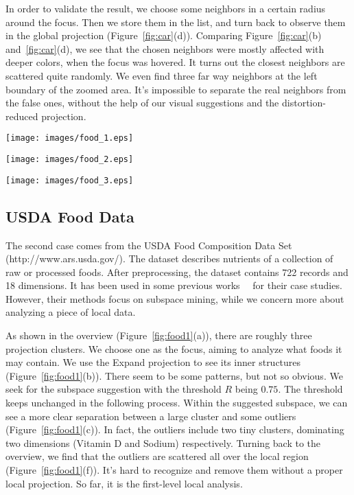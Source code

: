 In order to validate the result, we choose some neighbors in a certain radius around the focus. Then we store them in the list, and turn back to observe them in the global projection (Figure~\ref{fig:car}(d)). Comparing Figure~\ref{fig:car}(b) and~\ref{fig:car}(d), we see that the chosen neighbors were mostly affected with deeper colors, when the focus was hovered. It turns out the closest neighbors are scattered quite randomly. We even find three far way neighbors at the left boundary of the zoomed area. It's impossible to separate the real neighbors from the false ones, without the help of our visual suggestions and the distortion-reduced projection.

\begin{figure*}[htbp]
\centering
  \texttt{[image: images/food\_1.eps]}%
  \caption{USDA Food Data: First-level local analysis}
\label{fig:food1}
  \end{figure*}

\begin{figure*}[htbp]
\centering
  \texttt{[image: images/food\_2.eps]}%
  \caption{USDA Food Data: Second-level local analysis}
\label{fig:food2}
  \end{figure*}

\begin{figure*}[htbp]
\centering
  \texttt{[image: images/food\_3.eps]}%
  \caption{USDA Food Data: Third-level local analysis}
\label{fig:food3}
  \end{figure*}

\subsection{USDA Food Data}
The second case comes from the USDA Food Composition Data Set (http://www.ars.usda.gov/).  The dataset describes nutrients of a collection of raw or processed foods. After preprocessing, the dataset contains 722 records and 18 dimensions. It has been used in some previous works~\cite{DBLP:conf/ieeevast/TatuMFBSSK12}~\cite{DBLP:journals/tvcg/YuanRWG13} for their case studies. However, their methods focus on subspace mining, while we concern more about analyzing a piece of local data.

As shown in the overview (Figure~\ref{fig:food1}(a)), there are roughly three projection clusters. We choose one as the focus, aiming to analyze what foods it may contain. We use the Expand projection to see its inner structures (Figure~\ref{fig:food1}(b)). There seem to be some patterns, but not so obvious. We seek for the subspace suggestion with the threshold $R$ being $0.75$. The threshold keeps unchanged in the following process. Within the suggested subspace, we can see a more clear separation between a large  cluster and some outliers (Figure~\ref{fig:food1}(c)). In fact, the outliers include two tiny clusters, dominating two dimensions (Vitamin D and Sodium) respectively. Turning back to the overview, we find that the outliers are scattered all over the local region (Figure~\ref{fig:food1}(f)). It's hard to recognize and remove them without a proper local projection. So far, it is the first-level local analysis.

